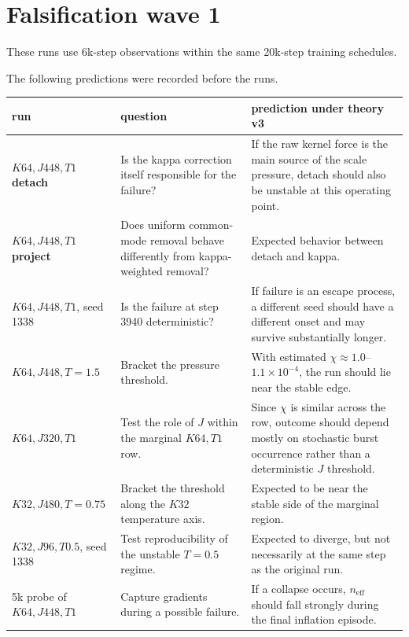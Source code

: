 \documentclass[11pt,a4paper]{article}
\newcommand{\neff}{n_{\mathrm{eff}}}
\begin{document}
\section{Falsification wave 1}

These runs use 6k-step observations within the same 20k-step training
schedules.

The following predictions were recorded before the runs.

\begin{center}\small
\begin{tabular}{p{3.6cm}p{4.4cm}p{5.6cm}}
\toprule
run & question & prediction under theory v3 \\
\midrule

\(K64,J448,T1\) \textbf{detach}
&
Is the kappa correction itself responsible for the failure?
&
If the raw kernel force is the main source of the scale pressure, detach
should also be unstable at this operating point.
\\

\(K64,J448,T1\) \textbf{project}
&
Does uniform common-mode removal behave differently from kappa-weighted
removal?
&
Expected behavior between detach and kappa.
\\

\(K64,J448,T1\), seed 1338
&
Is the failure at step 3940 deterministic?
&
If failure is an escape process, a different seed should have a different
onset and may survive substantially longer.
\\

\(K64,J448,T=1.5\)
&
Bracket the pressure threshold.
&
With estimated \(\chi\approx1.0\)--\(1.1\times10^{-4}\), the run should lie
near the stable edge.
\\

\(K64,J320,T1\)
&
Test the role of \(J\) within the marginal \(K64,T1\) row.
&
Since \(\chi\) is similar across the row, outcome should depend mostly on
stochastic burst occurrence rather than a deterministic \(J\) threshold.
\\

\(K32,J480,T=0.75\)
&
Bracket the threshold along the \(K32\) temperature axis.
&
Expected to be near the stable side of the marginal region.
\\

\(K32,J96,T0.5\), seed 1338
&
Test reproducibility of the unstable \(T=0.5\) regime.
&
Expected to diverge, but not necessarily at the same step as the original run.
\\

5k probe of \(K64,J448,T1\)
&
Capture gradients during a possible failure.
&
If a collapse occurs, \(\neff\) should fall strongly during the final
inflation episode.
\\

\bottomrule
\end{tabular}
\end{center}
\end{document}
